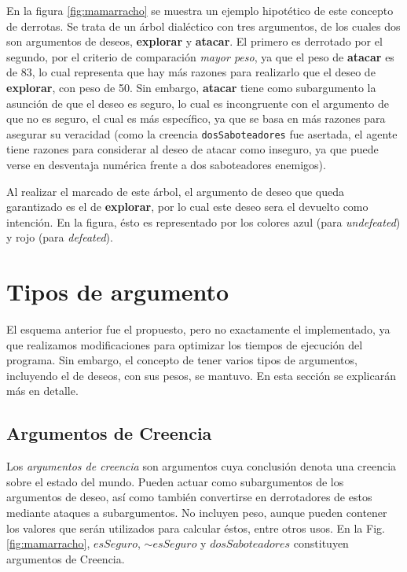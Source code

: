 \documentclass[oneside]{book}
\theoremstyle{definition}
\theoremstyle{example}
\newcommand{\no}{\mbox{$\sim$}}
\newcommand{\lit}[1]{\mbox{$ #1$}}
\begin{document}
En la figura \ref{fig:mamarracho} se muestra un ejemplo hipotético de este 
concepto de derrotas. Se 
trata de un árbol dialéctico con tres argumentos, de los cuales dos son
argumentos de deseos, \textbf{explorar} y \textbf{atacar}. El primero es
derrotado por el segundo, por el criterio de comparación \textit{mayor peso},
ya que el peso de \textbf{atacar} es de 83, lo cual representa que hay más 
razones para realizarlo que el deseo de \textbf{explorar}, con peso de 50. Sin
embargo, \textbf{atacar} tiene como subargumento la asunción de que el deseo es
seguro, lo cual es incongruente con el argumento de que no es seguro, el cual 
es más específico, ya que se basa en más razones para asegurar su veracidad 
(como la creencia \texttt{dosSaboteadores} fue asertada, el agente tiene 
razones para considerar al deseo de atacar como inseguro, ya que puede verse
en desventaja numérica frente a dos saboteadores enemigos).

Al realizar el marcado de este árbol, el argumento de deseo que queda 
garantizado es el de \textbf{explorar}, por lo cual este deseo sera el devuelto
como intención. En la figura, ésto es representado por los colores azul (para
\textit{undefeated}) y rojo (para \textit{defeated}).


\section{Tipos de argumento}

\label{sec:tiposArgumento}


El esquema anterior fue el propuesto, pero no exactamente el implementado, ya que
realizamos modificaciones para optimizar los tiempos de ejecución del programa. Sin 
embargo, el concepto de tener varios tipos de argumentos, incluyendo el de deseos, con sus
pesos, se mantuvo. En esta sección se explicarán más en detalle.

\subsection{Argumentos de Creencia}

\label{sec:argumentosSoporte}

Los \textit{argumentos de creencia} son argumentos cuya conclusión denota una creencia 
sobre el estado del mundo. Pueden actuar como subargumentos de los argumentos
de deseo, así como también convertirse en derrotadores de estos mediante ataques a 
subargumentos. No incluyen peso, aunque pueden contener los valores que serán utilizados 
para calcular éstos, entre otros usos. En la Fig. \ref{fig:mamarracho}, \lit{esSeguro}, 
\lit{\no esSeguro} y \lit{dosSaboteadores} constituyen argumentos de Creencia.
\end{document}
